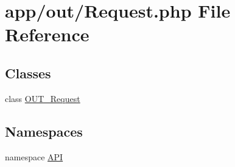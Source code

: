 \hypertarget{Request_8php}{
\section{app/out/Request.php File Reference}
\label{db/d81/Request_8php}
}
\subsection*{Classes}
\begin{DoxyCompactItemize}
\item 
class \hyperlink{classOUT__Request}{OUT\_\-Request}
\end{DoxyCompactItemize}
\subsection*{Namespaces}
\begin{DoxyCompactItemize}
\item 
namespace \hyperlink{namespaceAPI}{API}
\end{DoxyCompactItemize}
